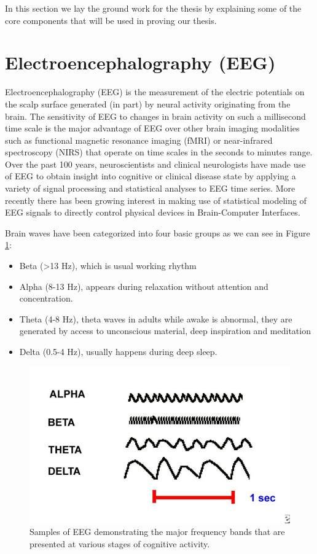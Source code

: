 \documentclass[12pt,a4paper,titlepage,openany]{report}
\begin{document}
In this section we lay the ground work for the thesis by explaining some of the core components that will be used in proving our thesis.

\section{Electroencephalography (EEG)}

Electroencephalography (EEG) \cite{wikipediaEEG} is the measurement of the electric potentials on the scalp surface generated (in part) by neural activity originating from the brain. 
The sensitivity of EEG to changes in brain activity on such a millisecond time scale is the major advantage of EEG over other brain imaging modalities such as functional magnetic resonance imaging (fMRI) or near-infrared spectroscopy (NIRS) that operate on time scales in the seconds to minutes range. 
Over the past 100 years, neuroscientists and clinical neurologists have made use of EEG to obtain insight into cognitive or clinical disease state by applying a variety of signal processing and statistical analyses to EEG time series. 
More recently there has been growing interest in making use of statistical modeling of EEG signals to directly control physical devices in Brain-Computer Interfaces\cite{nunez2016}.

Brain waves have been categorized into four basic groups \cite{teplan2002} as we can see in Figure \ref{fig:brain-waves}: 
\begin{itemize}
    \item Beta (\textgreater13 Hz), which is usual working rhythm
    \item Alpha (8-13 Hz), appears  during  relaxation  without attention and concentration.
    \item Theta (4-8 Hz), theta waves in adults while awake is abnormal, they are generated by access to unconscious material, deep inspiration and meditation 
    \item Delta (0.5-4 Hz), usually happens during deep sleep\cite{khalifa2012}.
\end{itemize}

\begin{figure}[H]
     \centering
     \includegraphics[width=1\linewidth]{./misc/waves.png}
     \caption{Samples of EEG demonstrating the major frequency bands that are presented at various stages of cognitive activity\cite{khalifa2012}.}
     \label{fig:brain-waves}
\end{figure}
\end{document}
